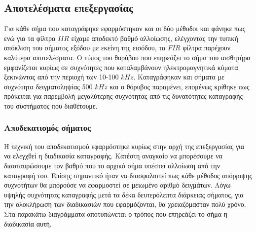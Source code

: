 \documentclass[breaklines=true, 12pt]{article}
\begin{document}
\subsection{Αποτελέσματα επεξεργασίας}
\label{sec:org9fbd2e0}
Για κάθε σήμα που καταγράφηκε εφαρμόστηκαν και οι δύο μέθοδοι και φάνηκε πως
ενώ για τα φίλτρα \(IIR\) είχαμε αποδεκτό βαθμό αλλοίωσης, ελέγχοντας την
τυπική απόκλιση του σήματος εξόδου με εκείνη της εισόδου, τα \(FIR\)
φίλτρα παρέχουν καλύτερα αποτελέσματα. Ο τύπος του θορύβου που επηρεάζει το
σήμα του αισθητήρα εμφανίζεται κυρίως σε συχνότητες που καταλαμβάνουν
ηλεκτρομαγνητικά κύματα ξεκινώντας από την περιοχή των 10-100 \(kHz\).
Καταγράφηκαν και σήματα με συχνότητα δειγματοληψίας 500 \(kHz\) και ο θόρυβος
παραμένει, επομένως κρίθηκε πως πρόκειται για παρεμβολή μεγαλύτερης συχνότητας
από τις δυνατότητες καταγραφής του συστήματος που διαθέτουμε.
\subsubsection{Αποδεκατισμός σήματος}
\label{sec:org2644c72}
Η τεχνική του αποδεκατισμού εφαρμόστηκε κυρίως στην αρχή της επεξεργασίας
για να ελεγχθεί η διαδικασία καταγραφής. Κατέστη αναγκαίο να μπορέσουμε
να διασταυρώσουμε τον βαθμό που το αρχικό σήμα υπέστει αλλοίωση από την
καταγραφή του. Επίσης σημαντικό ήταν να διασφαλιστεί πως κάθε μέθοδος
απόρριψης συχνοτήτων θα μπορούσε να εφαρμοστεί σε μειωμένο αριθμό
δειγμάτων. Λόγω υψηλής συχνότητας καταγραφής μετά τα δέκα δευτερόλεπτα
διάρκειας σήματος, για την ολοκλήρωση των διαδικασιών που εφαρμόζονται, θα
χρειαζόμασταν πολύ χρόνο. Στα παρακάτω διαγράμματα αποτυπώνεται ο τρόπος
που επηρεάζει το σήμα η διαδικασία αυτή.
\end{document}
